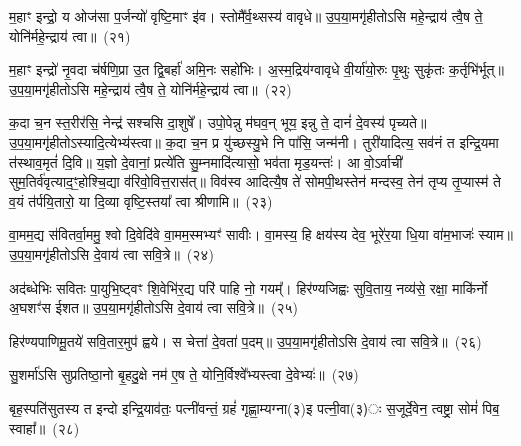 म॒हाꣳ इन्द्रो॒ य ओज॑सा प॒र्जन्यो॑ वृष्टि॒माꣳ इ॑व। स्तोमै᳚र्व॒थ्सस्य॑ वावृधे॥ उ॒प॒या॒मगृ॑हीतो\-ऽसि महे॒न्द्राय॑ त्वै॒ष ते॒ योनि॑र्महे॒न्द्राय॑ त्वा॥~(२१)

{\anuvakamend[{म॒हानेका॒न्नविꣳ॑शतिः}]}%

म॒हाꣳ इन्द्रो॑ नृ॒वदा च॑र्\mbox{}षणि॒प्रा उ॒त द्वि॒बर्\mbox{}हा॑ अमि॒नः सहो॑भिः। अ॒स्म॒द्रिय॑ग्वावृधे वी॒र्या॑यो॒रुः पृ॒थुः सुकृ॑तः क॒र्तृभि॑र्भूत्॥ उ॒प॒या॒मगृ॑हीतो\-ऽसि महे॒न्द्राय॑ त्वै॒ष ते॒ योनि॑र्महे॒न्द्राय॑ त्वा॥~(२२)

{\anuvakamend[{म॒हान्नृ॒वत्षड्विꣳ॑शतिः}]}%

क॒दा च॒न स्त॒रीर॑सि॒ नेन्द्र॑ सश्चसि दा॒शुषे᳚। उपो॒पेन्नु म॑घव॒न् भूय॒ इन्नु ते॒ दानं॑ दे॒वस्य॑ पृच्यते॥ उ॒प॒या॒मगृ॑हीतो\-ऽस्यादि॒त्येभ्य॑स्त्वा॥ क॒दा च॒न प्र यु॑च्छस्यु॒भे नि पा॑सि॒ जन्म॑नी। तुरी॑यादित्य॒ सव॑नं त इन्द्रि॒यमा त॑स्थाव॒मृतं॑ दि॒वि॥ य॒ज्ञो दे॒वानां॒ प्रत्ये॑ति सु॒म्नमादि॑त्यासो॒ भव॑ता मृड॒यन्तः॑। आ वो॒ऽर्वाची॑ सुम॒तिर्व॑वृत्याद॒ꣳ॒होश्चि॒द्या व॑रिवो॒वित्त॒रास॑त्॥ विव॑स्व आदित्यै॒ष ते॑ सोमपी॒थस्तेन॑ मन्दस्व॒ तेन॑ तृप्य तृ॒प्यास्म॑ ते व॒यं त॑र्पयि॒तारो॒ या दि॒व्या वृष्टि॒स्तया᳚ त्वा श्रीणामि॥~(२३)

{\anuvakamend[{वः॒ स॒प्तविꣳ॑शतिश्च}]}%

वा॒मम॒द्य स॑वितर्वा॒ममु॒ श्वो दि॒वेदि॑वे वा॒मम॒स्मभ्यꣳ॑ सावीः। वा॒मस्य॒ हि क्षय॑स्य देव॒ भूरे॑र॒या धि॒या वा॑म॒भाजः॑ स्याम॥ उ॒प॒या॒मगृ॑हीतो\-ऽसि दे॒वाय॑ त्वा सवि॒त्रे॥~(२४)

{\anuvakamend[{वा॒मं चतु॑र्विꣳशतिः}]}%

अद॑ब्धेभिः सवितः पा॒युभि॒ष्ट्वꣳ शि॒वेभि॑र॒द्य परि॑ पाहि नो॒ गयम्᳚। हिर॑ण्यजिह्वः सुवि॒ताय॒ नव्य॑से॒ रक्षा॒ माकि॑र्नो अ॒घशꣳ॑स ईशत॥ उ॒प॒या॒मगृ॑हीतो\-ऽसि दे॒वाय॑ त्वा सवि॒त्रे॥~(२५)

{\anuvakamend[{अद॑ब्धेभि॒स्त्रयो॑विꣳशतिः}]}%

हिर॑ण्यपाणिमू॒तये॑ सवि॒तार॒मुप॑ ह्वये। स चेत्ता॑ दे॒वता॑ प॒दम्॥ उ॒प॒या॒मगृ॑हीतो\-ऽसि दे॒वाय॑ त्वा सवि॒त्रे॥~(२६)

{\anuvakamend[{हिर॑ण्यपाणिं॒ चतु॑र्दश}]}%

सु॒शर्मा॑\-ऽसि सुप्रतिष्ठा॒नो बृ॒हदु॒क्षे नम॑ ए॒ष ते॒ योनि॒र्विश्वे᳚भ्यस्त्वा दे॒वेभ्यः॑॥~(२७)

{\anuvakamend[{सु॒शर्मा॒ द्वाद॑श}]}%

बृह॒स्पति॑सुतस्य त इन्दो इन्द्रि॒याव॑तः॒ पत्नी॑वन्तं॒ ग्रहं॑ गृह्णा॒म्यग्ना(३)इ पत्नी॒वा(३)ः स॒जूर्दे॒वेन॒ त्वष्ट्रा॒ सोमं॑ पिब॒ स्वाहा᳚॥~(२८)

